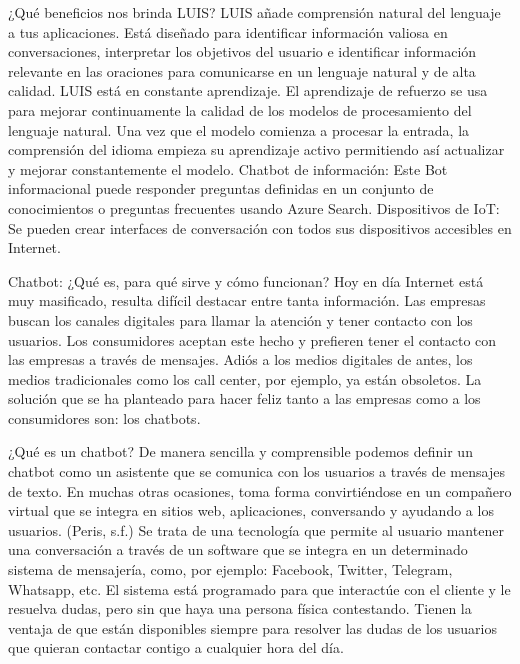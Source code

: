 ¿Qué beneficios nos brinda LUIS?
LUIS añade comprensión natural del lenguaje a tus aplicaciones. Está diseñado para identificar información valiosa en conversaciones, interpretar los objetivos del usuario e identificar información relevante en las oraciones para comunicarse en un lenguaje natural y de alta calidad.
LUIS está en constante aprendizaje. El aprendizaje de refuerzo se usa para mejorar continuamente la calidad de los modelos de procesamiento del lenguaje natural.
Una vez que el modelo comienza a procesar la entrada, la comprensión del idioma empieza su aprendizaje activo permitiendo así actualizar y mejorar constantemente el modelo.
Chatbot de información: Este Bot informacional puede responder preguntas definidas en un conjunto de conocimientos o preguntas frecuentes usando Azure Search.
Dispositivos de IoT: Se pueden crear interfaces de conversación con todos sus dispositivos accesibles en Internet.




Chatbot: ¿Qué es, para qué sirve y cómo funcionan?
Hoy en día Internet está muy masificado, resulta difícil destacar entre tanta información. Las empresas buscan los canales digitales para llamar la atención y tener contacto con los usuarios. Los consumidores aceptan este hecho y prefieren tener el contacto con las empresas a través de mensajes.
Adiós a los medios digitales de antes, los medios tradicionales como los call center, por ejemplo, ya están obsoletos. La solución que se ha planteado para hacer feliz tanto a las empresas como a los consumidores son: los chatbots.

¿Qué es un chatbot?
De manera sencilla y comprensible podemos definir un chatbot como un asistente que se comunica con los usuarios a través de mensajes de texto. En muchas otras ocasiones, toma forma convirtiéndose en un compañero virtual que se integra en sitios web, aplicaciones, conversando y ayudando a los usuarios. (Peris, s.f.)
Se trata de una tecnología que permite al usuario mantener una conversación a través de un software que se integra en un determinado sistema de mensajería, como, por ejemplo: Facebook, Twitter, Telegram, Whatsapp, etc.
El sistema está programado para que interactúe con el cliente y le resuelva dudas, pero sin que haya una persona física contestando. Tienen la ventaja de que están disponibles siempre para resolver las dudas de los usuarios que quieran contactar contigo a cualquier hora del día.

